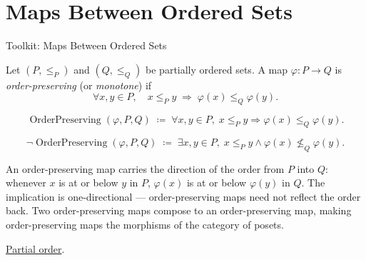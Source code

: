 
\section{Maps Between Ordered Sets}
\label{sec:maps-ordered-sets}

\begin{definitionbox}{Toolkit: Maps Between Ordered Sets}
\begin{definition}
\label{def:order-preserving-map}
Let $(P, \leq_P)$ and $(Q, \leq_Q)$ be partially ordered sets.  A map
$\varphi : P \to Q$ is \emph{order-preserving} (or \emph{monotone}) if
\[
\forall x, y \in P, \quad
x \leq_P y \;\Longrightarrow\; \varphi(x) \leq_Q \varphi(y).
\]
\end{definition}
\end{definitionbox}

\begin{remark*}
\[
\operatorname{OrderPreserving}(\varphi, P, Q)
\;\coloneqq\;
\forall x, y \in P,\;
x \leq_P y \Rightarrow \varphi(x) \leq_Q \varphi(y).
\]
\end{remark*}

\begin{remark*}
\[
\neg\operatorname{OrderPreserving}(\varphi, P, Q)
\;\coloneqq\;
\exists x, y \in P,\;
x \leq_P y \land \varphi(x) \not\leq_Q \varphi(y).
\]
\end{remark*}

\begin{remark*}[Interpretation]
An order-preserving map carries the direction of the order from $P$ into
$Q$: whenever $x$ is at or below $y$ in $P$, $\varphi(x)$ is at or below
$\varphi(y)$ in $Q$.  The implication is one-directional — order-preserving
maps need not reflect the order back.  Two order-preserving maps compose
to an order-preserving map, making order-preserving maps the morphisms
of the category of posets.
\end{remark*}

\begin{remark*}[Dependencies]
\hyperref[def:partial-order]{Partial order}.
\end{remark*}


